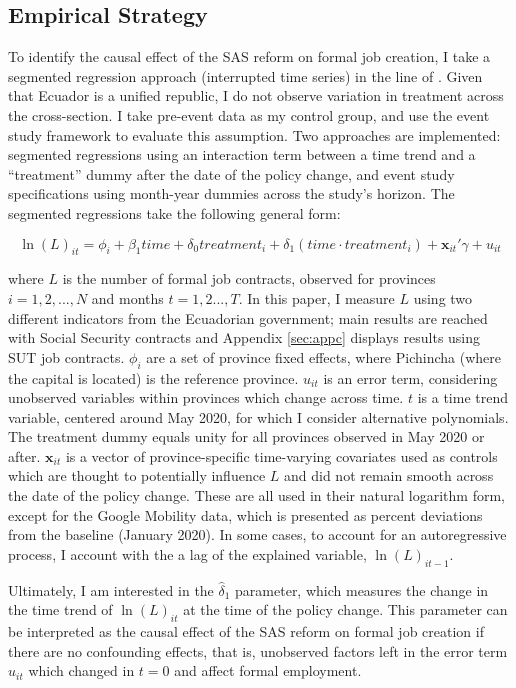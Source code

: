 \documentclass[11pt,a4paper]{article}\usepackage[]{graphicx}\usepackage[]{xcolor}
\begin{document}
\subsection{Empirical Strategy}

To identify the causal effect of the SAS reform on formal job creation, I take a segmented regression approach (interrupted time series) in the line of \textcite{Taljaard.2014}. Given that Ecuador is a unified republic, I do not observe variation in treatment across the cross-section. I take pre-event data as my control group, and use the event study framework to evaluate this assumption. Two approaches are implemented: segmented regressions using an interaction term between a time trend and a ``treatment'' dummy after the date of the policy change, and event study specifications using month-year dummies across the study's horizon. The segmented regressions take the following general form:

\begin{equation}
\label{eqn:seg}
\ln(L)_{it} = \phi_i + \beta_1 time + \delta_0 treatment_{i} + \delta_1(time \cdot treatment_{i}) + \mathbf{x}_{it}'\gamma + u_{it}
\end{equation}

where $L$ is the number of formal job contracts, observed for provinces $i = 1, 2, ..., N$ and months $t = 1,2 ..., T$. In this paper, I measure $L$ using two different indicators from the Ecuadorian government; main results are reached with Social Security contracts and Appendix \ref{sec:appc} displays results using SUT job contracts. $\phi_i$ are a set of province fixed effects, where Pichincha (where the capital is located) is the reference province. $u_{it}$ is an error term, considering unobserved variables within provinces which change across time. $t$ is a time trend variable, centered around May 2020, for which I consider alternative polynomials. The treatment dummy equals unity for all provinces observed in May 2020 or after. $\mathbf{x}_{it}$ is a vector of province-specific time-varying covariates used as controls which are thought to potentially influence $L$ and did not remain smooth across the date of the policy change. These are all used in their natural logarithm form, except for the Google Mobility data, which is presented as percent deviations from the baseline (January 2020). In some cases, to account for an autoregressive process, I account with the a lag of the explained variable, $\ln(L)_{it-1}$.

Ultimately, I am interested in the $\hat{\delta}_1 $ parameter, which measures the change in the time trend of $\ln(L)_{it}$ at the time of the policy change. This parameter can be interpreted as the causal effect of the SAS reform on formal job creation if there are no confounding effects, that is, unobserved factors left in the error term $u_{it}$ which changed in $t = 0$ and affect formal employment.
\end{document}
